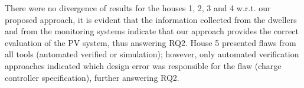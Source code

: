 \documentclass[review]{elsarticle}
\begin{document}
There were no divergence of results for the houses 1, 2, 3 and 4 w.r.t. our proposed approach, it is evident that the information collected from the dwellers and from the monitoring systems indicate that our approach provides the correct evaluation of the PV system, thus answering RQ2. House 5 presented flaws from all tools (automated verified or simulation); however, only automated verification approaches indicated which design error was responsible for the flaw (charge controller specification), further answering RQ2.
%
%
%
\end{document}
